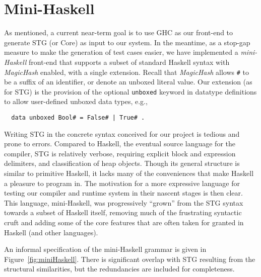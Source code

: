\documentclass{llncs}
\begin{document}
%
%

\appendix

\section{Mini-Haskell}

As mentioned, a current near-term goal is to use GHC as our front-end to
generate STG (or Core) as input to our system.  In the meantime, as a stop-gap
measure to make the generation of test cases easier, we have implemented a
\emph{mini-Haskell} front-end that supports a subset of standard Haskell
syntax with \emph{MagicHash} enabled, with a single extension.  Recall that
\emph{MagicHash} allows \texttt{\#} to be a suffix of an identifier, or denote
an unboxed literal value.  Our extension (as for STG) is the provision of
the optional \texttt{unboxed} keyword in datatype definitions to allow
user-defined unboxed data types, e.g.,
\begin{verbatim}
  data unboxed Bool# = False# | True# .
\end{verbatim}

Writing STG in the concrete syntax conceived for our project is tedious and
prone to errors.  Compared to Haskell, the eventual source language for the
compiler, STG is relatively verbose, requiring explicit block and expression
delimiters, and classification of heap objects. Though its general structure
is similar to primitive Haskell, it lacks many of the conveniences that make
Haskell a pleasure to program in.  The motivation for a more expressive
language for testing our compiler and runtime system in their nascent stages
is then clear.  This language, mini-Haskell, was progressively ``grown'' from
the STG syntax towards a subset of Haskell itself, removing much of the
frustrating syntactic cruft and adding some of the core features that are
often taken for granted in Haskell (and other languages).

An informal specification of the mini-Haskell grammar is given in
Figure~\ref{fig:miniHaskell}.  There is significant overlap with STG resulting
from the structural similarities, but the redundancies are included for
completeness.



\end{document}
